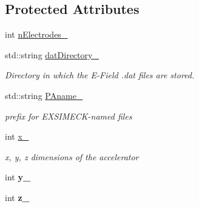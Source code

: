 \subsection*{Protected Attributes}
\begin{DoxyCompactItemize}
\item 
int \hyperlink{classAcceleratorConfig_af60eff50588b2990eb9020780a56362b}{n\+Electrodes\+\_\+}
\item 
\hypertarget{classAcceleratorConfig_a8f03c11a1e8f3e4d5ddaae709846355a}{std\+::string \hyperlink{classAcceleratorConfig_a8f03c11a1e8f3e4d5ddaae709846355a}{dat\+Directory\+\_\+}}\label{classAcceleratorConfig_a8f03c11a1e8f3e4d5ddaae709846355a}

\begin{DoxyCompactList}\small\item\em Directory in which the E-\/\+Field .dat files are stored. \end{DoxyCompactList}\item 
\hypertarget{classAcceleratorConfig_a0c8d1e202de2e9f217cf860a99527978}{std\+::string \hyperlink{classAcceleratorConfig_a0c8d1e202de2e9f217cf860a99527978}{P\+Aname\+\_\+}}\label{classAcceleratorConfig_a0c8d1e202de2e9f217cf860a99527978}

\begin{DoxyCompactList}\small\item\em prefix for E\+X\+S\+I\+M\+E\+C\+K-\/named files \end{DoxyCompactList}\end{DoxyCompactItemize}
{\bf }\par
\begin{DoxyCompactItemize}
\item 
\hypertarget{classAcceleratorConfig_a23eb43d1ba8e0d4afb71e94116742b68}{int \hyperlink{classAcceleratorConfig_a23eb43d1ba8e0d4afb71e94116742b68}{x\+\_\+}}\label{classAcceleratorConfig_a23eb43d1ba8e0d4afb71e94116742b68}

\begin{DoxyCompactList}\small\item\em x, y, z dimensions of the accelerator \end{DoxyCompactList}\item 
\hypertarget{classAcceleratorConfig_a2db56fde78ca48e3f067bb21f28b23aa}{int {\bfseries y\+\_\+}}\label{classAcceleratorConfig_a2db56fde78ca48e3f067bb21f28b23aa}

\item 
\hypertarget{classAcceleratorConfig_afd1f3499f4f618c7a777387905d65207}{int {\bfseries z\+\_\+}}\label{classAcceleratorConfig_afd1f3499f4f618c7a777387905d65207}

\end{DoxyCompactItemize}



